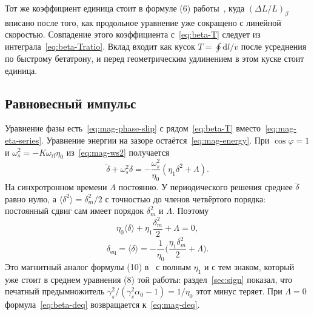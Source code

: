 \documentclass[aps,pra,preprint,a4paper,amsmath,amssymb,longbibliography]{revtex4-2}
\begin{document}
Тот же коэффициент единица стоит в формуле (6) работы~\cite{Senichev2013}, куда $(\Delta L/L)_\beta$ вписано после того, как продольное уравнение уже сокращено с линейной скоростью. Совпадение этого коэффициента с~\eqref{eq:beta-T} следует из интеграла~\eqref{eq:beta-Tratio}. Вклад входит как кусок $T=\oint\mathrm{d}l/v$ после усреднения по быстрому бетатрону, и перед геометрическим удлинением в этом куске стоит единица.

\subsection{Равновесный импульс}
\label{sec:ch2-eq}

Уравнение фазы есть~\eqref{eq:mag-phase-slip} с рядом~\eqref{eq:beta-T} вместо~\eqref{eq:mag-eta-series}. Уравнение энергии на зазоре остаётся~\eqref{eq:mag-energy}. При $\cos\varphi=1$ и $\omega_s^2=-K\omega_{\mathrm{rf}}\eta_0$ из~\eqref{eq:mag-ws2} получается
\begin{equation}
\label{eq:beta-osc}
\ddot\delta+\omega_s^2\delta
=-\frac{\omega_s^2}{\eta_0}(\eta_1\delta^2+\Lambda).
\end{equation}
На синхротронном времени $\Lambda$ постоянно. У периодического решения среднее $\ddot\delta$ равно нулю, а $\langle\delta^2\rangle=\delta_m^2/2$ с точностью до членов четвёртого порядка: постоянный сдвиг сам имеет порядок $\delta_m^2$ и $\Lambda$. Поэтому
\begin{equation}
\label{eq:beta-avg}
\eta_0\langle\delta\rangle+\eta_1\frac{\delta_m^2}{2}+\Lambda=0,
\end{equation}
\begin{equation}
\label{eq:beta-deq}
\delta_{\mathrm{eq}}
=\langle\delta\rangle
=-\frac{1}{\eta_0}
\Biggl(\frac{\eta_1\delta_m^2}{2}+\Lambda\Biggr).
\end{equation}
Это магнитный аналог формулы (10) в~\cite{Senichev2013} с полным $\eta_1$ и с тем знаком, который уже стоит в среднем уравнения (8) той работы: раздел~\ref{sec:sign} показал, что печатный предымножитель $\gamma_s^2/(\gamma_s^2\alpha_0-1)=1/\eta_0$ этот минус теряет. При $\Lambda=0$ формула~\eqref{eq:beta-deq} возвращается к~\eqref{eq:mag-deq}.
\end{document}
